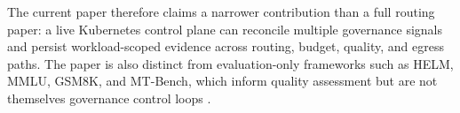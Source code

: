 The current paper therefore claims a narrower contribution than a full routing paper: a live Kubernetes control plane can reconcile multiple governance signals and persist workload-scoped evidence across routing, budget, quality, and egress paths. The paper is also distinct from evaluation-only frameworks such as HELM, MMLU, GSM8K, and MT-Bench, which inform quality assessment but are not themselves governance control loops \cite{liang2022helm,hendrycks2020mmlu,cobbe2021gsm8k,zheng2023mtbench}.
